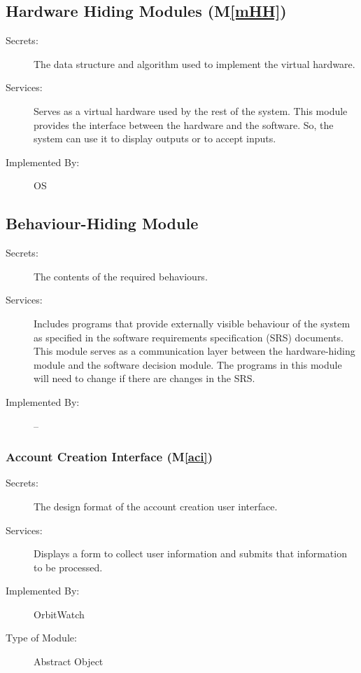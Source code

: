 \documentclass[12pt, titlepage]{article}
\newcommand{\mref}[1]{M\ref{#1}}
\begin{document}
\subsection{Hardware Hiding Modules (\mref{mHH})}

\begin{description}
\item[Secrets:]The data structure and algorithm used to implement the virtual
  hardware.
\item[Services:]Serves as a virtual hardware used by the rest of the
  system. This module provides the interface between the hardware and the
  software. So, the system can use it to display outputs or to accept inputs.
\item[Implemented By:] OS
\end{description}

\subsection{Behaviour-Hiding Module}

\begin{description}
\item[Secrets:]The contents of the required behaviours.
\item[Services:]Includes programs that provide externally visible behaviour of
  the system as specified in the software requirements specification (SRS)
  documents. This module serves as a communication layer between the
  hardware-hiding module and the software decision module. The programs in this
  module will need to change if there are changes in the SRS.
\item[Implemented By:] --
\end{description}


\subsubsection{Account Creation Interface (\mref{aci})}

\begin{description}
\item[Secrets:]The design format of the account creation user interface.
\item[Services:] Displays a form to collect user information and submits that information to be processed.
\item[Implemented By:] OrbitWatch
\item[Type of Module:] Abstract Object
\end{description}
\end{document}
